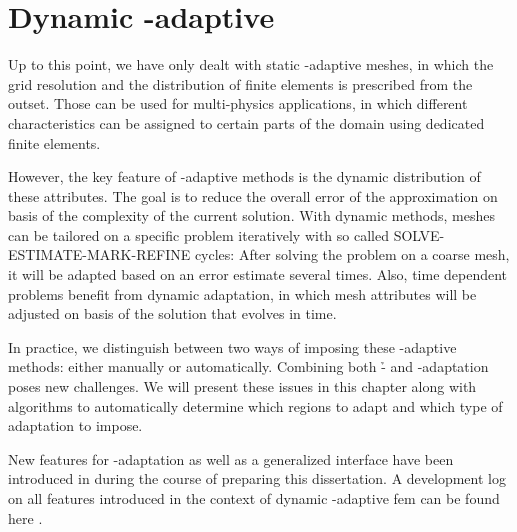 \chapter{Dynamic \hp-adaptive }
\label{ch:dynamic}

Up to this point, we have only dealt with static \hp-adaptive meshes, in which the grid resolution and the distribution of finite elements is prescribed from the outset. Those can be used for multi-physics applications, in which different characteristics can be assigned to certain parts of the domain using dedicated finite elements.

However, the key feature of \hp-adaptive methods is the dynamic distribution of these attributes. The goal is to reduce the overall error of the approximation on basis of the complexity of the current solution. With dynamic methods, meshes can be tailored on a specific problem iteratively with so called SOLVE-ESTIMATE-MARK-REFINE cycles: After solving the problem on a coarse mesh, it will be adapted based on an error estimate several times. Also, time dependent problems benefit from dynamic adaptation, in which mesh attributes will be adjusted on basis of the solution that evolves in time.

In practice, we distinguish between two ways of imposing these \hp-adaptive methods: either manually or automatically. Combining both \h- and \p-adaptation poses new challenges. We will present these issues in this chapter along with algorithms to automatically determine which regions to adapt and which type of adaptation to impose.

New features for \hp-adaptation as well as a generalized interface have been introduced in \dealii{} during the course of preparing this dissertation. A development log on all features introduced in the context of dynamic \hp-adaptive \gls{fem} can be found here \cite{dealiiissue7515}.



